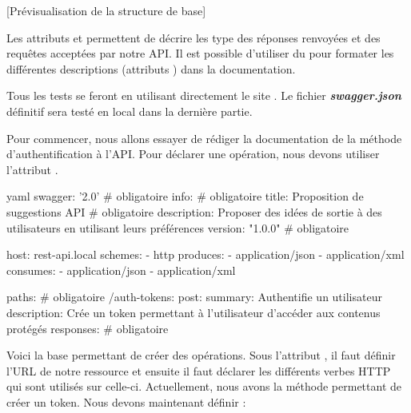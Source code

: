 \documentclass[big]{zmdocument}
\begin{document}
[Prévisualisation de la structure de base]


Les attributs  et  permettent de décrire les type  des réponses renvoyées et des requêtes acceptées par notre API.
Il est possible d'utiliser du  pour formater les différentes descriptions (attributs ) dans la documentation.



\begin{Information}
Tous les tests se feront en utilisant directement le site . Le fichier \textbf{\textit{swagger.json}} définitif sera testé en local dans la dernière partie.
\end{Information}






Pour commencer, nous allons essayer de rédiger la documentation de la méthode d'authentification à l'API.
Pour déclarer une opération, nous devons utiliser l'attribut .



\begin{CodeBlock}{yaml}
swagger: '2.0' # obligatoire
info: # obligatoire
  title: Proposition de suggestions API    # obligatoire
  description: Proposer des idées de sortie à des utilisateurs en utilisant leurs préférences
  version: "1.0.0" # obligatoire

host: rest-api.local
schemes:
  - http
produces:
  - application/json
  - application/xml
consumes:
  - application/json
  - application/xml
  
paths: # obligatoire
  /auth-tokens:
    post:
      summary: Authentifie un utilisateur
      description: Crée un token permettant à l'utilisateur d'accéder aux contenus protégés
      responses: # obligatoire
\end{CodeBlock}



Voici la base permettant de créer des opérations. Sous l'attribut , il faut définir l'URL de notre ressource et ensuite il faut déclarer les différents verbes HTTP qui sont utilisés sur celle-ci.
Actuellement, nous avons la méthode  permettant de créer un token. Nous devons maintenant définir :
\end{document}
